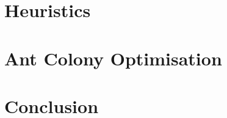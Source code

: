 \documentclass{article}
\begin{document}
\section{Heuristics}
\newpage
\section{Ant Colony Optimisation}
\newpage
\section{Conclusion}
\newpage


\end{document}
